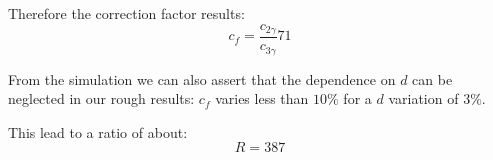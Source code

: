 \documentclass[main.tex]{subfiles}
\begin{document}
Therefore the correction factor results:
\begin{equation}
  c_f = \frac{c_{2\gamma}}{c_{3\gamma}}  71
\end{equation}

From the simulation we can also assert that the dependence on $d$ can be neglected in our rough results: $c_f$ varies less than $10\%$ for a $d$ variation of $3\%$.

This lead to a ratio of about:
\begin{equation}
  R = 387
\end{equation}


\end{document}
